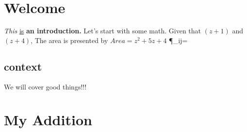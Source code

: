 \documentclass[11pt]{article}
\begin{document}
\section {Welcome}
\textit{This} \underline{is} \textbf{an introduction.}
Let's start with some math. Given that $(z+1)$ and $(z+4)$,
The area is presented by $Area=z^2+5z+4$
\P_{ij}=
\subsection[10]{context} We will cover good things!!!
\section{My Addition}
\end{document}
